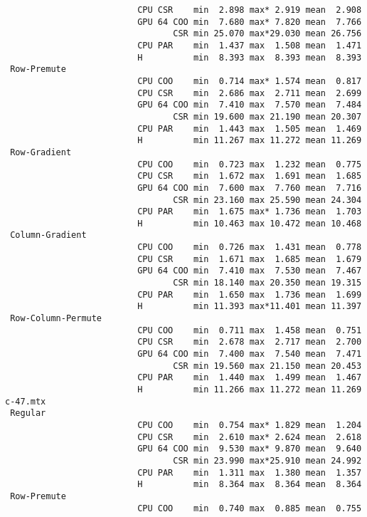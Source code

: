 \begin{verbatim}
                          CPU CSR    min  2.898 max* 2.919 mean  2.908
                          GPU 64 COO min  7.680 max* 7.820 mean  7.766
                                 CSR min 25.070 max*29.030 mean 26.756
                          CPU PAR    min  1.437 max  1.508 mean  1.471
                          H          min  8.393 max  8.393 mean  8.393
 Row-Premute
                          CPU COO    min  0.714 max* 1.574 mean  0.817
                          CPU CSR    min  2.686 max  2.711 mean  2.699
                          GPU 64 COO min  7.410 max  7.570 mean  7.484
                                 CSR min 19.600 max 21.190 mean 20.307
                          CPU PAR    min  1.443 max  1.505 mean  1.469
                          H          min 11.267 max 11.272 mean 11.269
 Row-Gradient
                          CPU COO    min  0.723 max  1.232 mean  0.775
                          CPU CSR    min  1.672 max  1.691 mean  1.685
                          GPU 64 COO min  7.600 max  7.760 mean  7.716
                                 CSR min 23.160 max 25.590 mean 24.304
                          CPU PAR    min  1.675 max* 1.736 mean  1.703
                          H          min 10.463 max 10.472 mean 10.468
 Column-Gradient
                          CPU COO    min  0.726 max  1.431 mean  0.778
                          CPU CSR    min  1.671 max  1.685 mean  1.679
                          GPU 64 COO min  7.410 max  7.530 mean  7.467
                                 CSR min 18.140 max 20.350 mean 19.315
                          CPU PAR    min  1.650 max  1.736 mean  1.699
                          H          min 11.393 max*11.401 mean 11.397
 Row-Column-Permute
                          CPU COO    min  0.711 max  1.458 mean  0.751
                          CPU CSR    min  2.678 max  2.717 mean  2.700
                          GPU 64 COO min  7.400 max  7.540 mean  7.471
                                 CSR min 19.560 max 21.150 mean 20.453
                          CPU PAR    min  1.440 max  1.499 mean  1.467
                          H          min 11.266 max 11.272 mean 11.269
c-47.mtx
 Regular
                          CPU COO    min  0.754 max* 1.829 mean  1.204
                          CPU CSR    min  2.610 max* 2.624 mean  2.618
                          GPU 64 COO min  9.530 max* 9.870 mean  9.640
                                 CSR min 23.990 max*25.910 mean 24.992
                          CPU PAR    min  1.311 max  1.380 mean  1.357
                          H          min  8.364 max  8.364 mean  8.364
 Row-Premute
                          CPU COO    min  0.740 max  0.885 mean  0.755

\end{verbatim}
